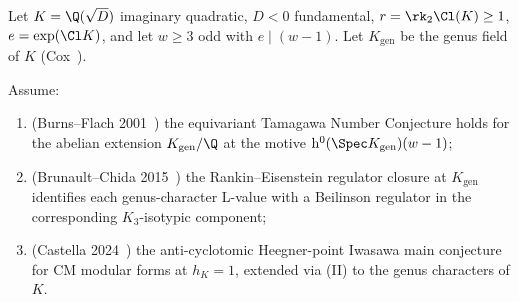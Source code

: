 \begin{theorem}
\label{thm:A3-COMP}
Let $K = \Q(\sqrt D)$ imaginary quadratic, $D < 0$ fundamental,
$r = \rk_2 \Cl(K) \ge 1$, $e = \exp(\Cl K)$, and let $w \ge 3$ odd with
$e \mid (w-1)$.  Let $K_{\mathrm{gen}}$ be the genus field of $K$
\textup{(}Cox~\cite[Thm.~6.1]{Cox1989}\textup{)}.

\smallskip Assume:
\begin{enumerate}[label=\textup{(\Roman*)}, leftmargin=*]
\item {\rm (Burns--Flach 2001~\cite{BurnsFlach2001Doc})} the
   equivariant Tamagawa Number Conjecture holds for the abelian
   extension $K_{\mathrm{gen}}/\Q$ at the motive
   $\mathrm{h}^0(\Spec K_{\mathrm{gen}})(w-1)$;
\item {\rm (Brunault--Chida 2015~\cite{BrunaultChida2015})} the
   Rankin--Eisenstein regulator closure at $K_{\mathrm{gen}}$ identifies
   each genus-character L-value with a Beilinson regulator in the
   corresponding $K_3$-isotypic component;
\item {\rm (Castella 2024~\cite{Castella2024})} the anti-cyclotomic
   Heegner-point Iwasawa main conjecture for CM modular forms at
   $h_K = 1$, extended via \textup{(II)} to the genus characters of $K$.
\end{enumerate}


\end{theorem}
